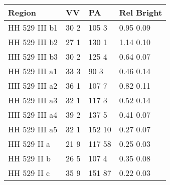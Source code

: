 \begin{tabular}{llll}
Region & VV & PA & Rel Bright\\
\hline
HH 529 III b1 & 30 \textpm{} 2 & 105  \textpm{} 3 & 0.95 \textpm{} 0.09\\
HH 529 III b2 & 27 \textpm{} 1 & 130  \textpm{} 1 & 1.14 \textpm{} 0.10\\
HH 529 III b3 & 30 \textpm{} 2 & 125  \textpm{} 4 & 0.64 \textpm{} 0.07\\
HH 529 III a1 & 33 \textpm{} 3 & 90  \textpm{}  3 & 0.46 \textpm{} 0.14\\
HH 529 III a2 & 36 \textpm{} 1 & 107 \textpm{} 7 & 0.82 \textpm{} 0.11\\
HH 529 III a3 & 32 \textpm{} 1 & 117  \textpm{}  3 & 0.52 \textpm{} 0.14\\
HH 529 III a4 & 39 \textpm{} 2 & 137  \textpm{}  5 & 0.41 \textpm{} 0.07\\
HH 529 III a5 & 32 \textpm{} 1 & 152  \textpm{} 10 & 0.27 \textpm{} 0.07\\
HH 529 II a & 21 \textpm{} 9 & 117  \textpm{} 58 & 0.25 \textpm{} 0.03\\
HH 529 II b & 26 \textpm{} 5 & 107  \textpm{}  4 & 0.35 \textpm{} 0.08\\
HH 529 II c & 35 \textpm{} 9 & 151  \textpm{} 87 & 0.22 \textpm{} 0.03\\
\end{tabular}
